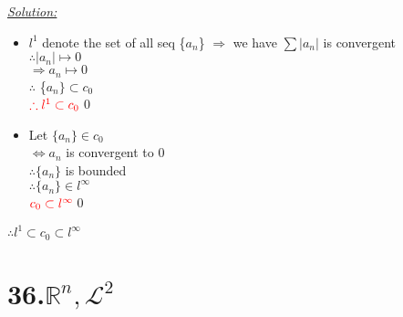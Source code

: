\documentclass[12pt]{article}
\begin{document}
\begin{center} 
\end{center}
\textit{\underline{\color{red}Solution:}}
\begin{itemize}
    \item $l^1$ denote the set of all seq \{$a_n$\}
    $\Rightarrow$ we have $\sum |a_n|$ is convergent\\
    $\therefore |a_n|\mapsto 0$\\
    $\Rightarrow a_n\mapsto 0$\\
    $\therefore $ \{$a_n\} \subset c_0$\\
    ${\color{red} \therefore l^1\subset c_0}$\qed
    \item Let $\{ a_n\}\in c_0$\\
    $\Leftrightarrow a_n$ is convergent to $0$\\
    $\therefore \{a_n\}$ is bounded \\
    $\therefore \{ a_n\}\in l^\infty$\\
    ${\color{red}c_0\subset l^\infty}$\qed
\end{itemize}
\begin{center}
    {\large \color{red} $\therefore l^1\subset c_0 \subset l^\infty$}
\end{center}
\newpage





\section*{36.$\mathbb{R}^n,\mathscr{L}^2$}
\end{document}
